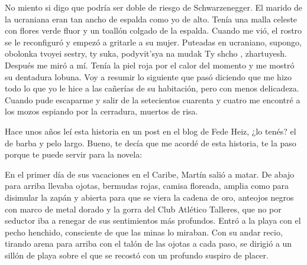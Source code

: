 \documentclass[12pt,twoside,openright,a5paper]{book}
\begin{document}
\vspace{0.5cm}
\hrulefill\hspace{0.2cm} \decofourleft\decofourright \hspace{0.2cm} \hrulefill
\vspace{0.5cm}

No miento si digo que podría ser doble de riesgo de Schwarzenegger. El
marido de la ucraniana eran tan ancho de espalda como yo de alto. Tenía
una malla celeste con flores verde fluor y un toallón colgado de la
espalda. Cuando me vió, el rostro se le reconfiguró y empezó a gritarle a
su mujer. Puteadas en ucraniano, supongo, obolonka tvoyei sestry, ty suka,
podyvit'sya na mudak Ty shcho , zhartuyesh. Después me miró a mí. Tenía
la piel roja por el calor del momento y me mostró su dentadura lobuna. Voy
a resumir lo siguiente que pasó diciendo que me hizo todo lo que yo le
hice a las cañerías de su habitación, pero con menos delicadeza. Cuando
pude escaparme y salir de la setecientos cuarenta y cuatro me encontré a
los mozos espiando por la cerradura, muertos de risa.


\vspace{0.5cm}
\hrulefill\hspace{0.2cm} \decofourleft\decofourright \hspace{0.2cm} \hrulefill
\vspace{0.5cm}

Hace unos años leí esta historia en un post en el blog de Fede Heiz,
¿lo tenés? el de barba y pelo largo. Bueno, te decía que me acordé de
esta historia, te la paso porque te puede servir para la novela:

En el primer día de sus vacaciones en el Caribe, Martín salió a matar. De
abajo para arriba llevaba ojotas, bermudas rojas, camisa floreada, amplia
como para disimular la zapán y abierta para que se viera la cadena de oro,
anteojos negros con marco de metal dorado y la gorra del Club Atlético
Talleres, que no por seductor iba a renegar de sus sentimientos más
profundos. Entró a la playa con el pecho henchido, consciente de que las
minas lo miraban. Con su andar recio, tirando arena para arriba con el
talón de las ojotas a cada paso, se dirigió a un sillón de playa sobre
el que se recostó con un profundo suspiro de placer.
\end{document}
